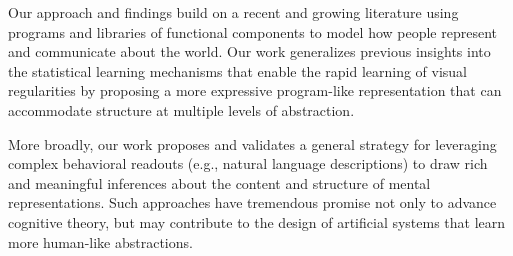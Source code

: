 
Our approach and findings build on a recent and growing literature using programs  and libraries of functional components  to model how people represent and communicate about the world. 
Our work generalizes previous insights into the statistical learning mechanisms that enable the rapid learning of visual regularities  by proposing a more expressive program-like representation that can accommodate structure at multiple levels of abstraction.

More broadly, our work proposes and validates a general strategy for leveraging complex behavioral readouts (e.g., natural language descriptions) to draw rich and meaningful inferences about the content and structure of mental representations.
Such approaches have tremendous promise not only to advance cognitive theory, but may contribute to the design of artificial systems that learn more human-like abstractions. 


\newpage





